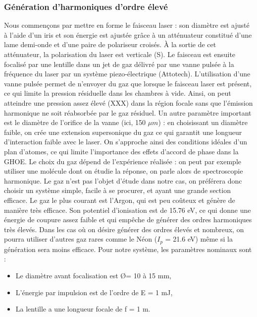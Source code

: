 \subsubsection{Génération d'harmoniques d'ordre élevé}
Nous commençons par mettre en forme le faisceau laser : son diamètre est ajusté à l'aide d'un iris et son énergie est ajustée grâce à un atténuateur constitué d'une lame demi-onde et d'une paire de polariseur croisés. \`{A} la sortie de cet atténuateur, la polarisation du laser est verticale (S). Le faisceau est ensuite focalisé par une lentille dans un jet de gaz délivré par une vanne pulsée à la fréquence du laser par un système piezo-électrique (Attotech). L'utilisation d'une vanne pulsée permet de n'envoyer du gaz que lorsque le faisceau laser est présent, ce qui limite la pression résiduelle dans les chambres à vide. Ainsi, on peut atteindre une pression assez élevé (XXX) dans la région focale sans que l'émission harmonique ne soit réabsorbée par le gaz résiduel. Un autre paramètre important est le diamètre de l'orifice de la vanne (ici, 150 $\mu m$) : en choisissant un diamètre faible, on crée une extension supersonique du gaz ce qui garantit une longueur d'interaction faible avec le laser. On s'approche ainsi des conditions idéales d'un plan d'atomes, ce qui limite l'importance des effets d'accord de phase dans la GHOE.
Le choix du gaz dépend de l'expérience réalisée : on peut par exemple utiliser une molécule dont on étudie la réponse, on parle alors de spectroscopie harmonique. Le gaz n'est pas l'objet d'étude dans notre cas, on préférera donc choisir un système simple, facile à se procurer, et ayant une grande section efficace. Le gaz le plus courant est l'Argon, qui est peu coûteux et génère de manière très efficace. Son potentiel d'ionisation est de 15.76 eV, ce qui donne une énergie de coupure assez faible et qui empêche de générer des ordres harmoniques très élevés. Dans les cas où on désire générer des ordres élevés et nombreux, on pourra utiliser d'autres gaz rares comme le Néon ($I_p$ = 21.6 eV) même si la génération sera moins efficace. 
%
Pour notre système, les paramètres nominaux sont :
\begin{itemize}
\item Le diamètre avant focalisation est \O = 10 à 15 mm,
\item L'énergie par impulsion est de l'ordre de E = 1 mJ,
\item La lentille a une longueur focale de f = 1 m.
\end{itemize}
%
